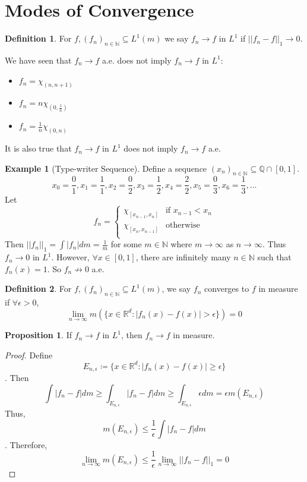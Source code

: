 \documentclass{article}
\theoremstyle{definition}
\newtheorem{definition}{Definition}[section]
\newtheorem{prop}{Proposition}[section]
\newtheorem{example}{Example}[section]
\theoremstyle{remark}
\theoremstyle{remark}
\def\reals{{\mathbb R}}
\def\naturals{{\mathbb N}}
\def\rationals{{\mathbb Q}}
\begin{document}
\section{Modes of Convergence}
\begin{definition}
For $f, (f_n)_{n\in\naturals} \subseteq L^1(m)$ we say $f_n \to f$ in $L^1$ if $||f_n - f||_1 \to 0$.
\end{definition}
We have seen that $f_n \to f$ a.e. does not imply $f_n \to f$ in $L^1$:
\begin{itemize}
	\item $f_n = \chi_{(n, n+1)}$
	\item $f_n = n\chi_{(0, \frac{1}{n})}$
	\item $f_n = \frac{1}{n}\chi_{(0, n)}$
\end{itemize}
It is also true that $f_n \to f$ in $L^1$ does not imply $f_n \to f$ a.e.
\begin{example}[Type-writer Sequence]
Define a sequence $(x_n)_{n\in\naturals} \subseteq \rationals \cap [0, 1]$.
$$x_0 = \frac{0}{1}, x_1 = \frac{1}{1}, x_2 = \frac{0}{2}, x_3 = \frac{1}{2}, x_4 = \frac{2}{2}, x_5 = \frac{0}{3}, x_6 = \frac{1}{3}, \dots $$
Let
$$ f_n = \begin{cases}
\chi_{[x_{n-1}, x_n]} & \text{if } x_{n-1} < x_n \\
\chi_{[x_n, x_{n-1}]} & \text{otherwise} \\
\end{cases}$$
Then $||f_n||_1 = \int |f_n| dm = \frac{1}{m}$ for some $m\in \naturals$ where $m\to \infty$ as $n\to \infty$. Thus $f_n\to 0$ in $L^1$. However, $\forall x \in [0, 1]$, there are infinitely many $n\in\naturals$ such that $f_n(x) = 1$. So $f_n\not\to 0$ a.e.
\end{example}
\begin{definition}
For $f, (f_n)_{n\in\naturals}\subseteq L^1(m)$, we say $f_n$ converges to $f$ in measure if $\forall \epsilon > 0$,
$$\lim_{n\to\infty} m(\{x\in \reals^d : |f_n(x) - f(x)| > \epsilon\}) = 0$$
\end{definition}
\begin{prop}
If $f_n\to f$ in $L^1$, then $f_n \to f$ in measure.
\end{prop}
\begin{proof}
Define 
$$E_{n, \epsilon} \coloneqq \{x\in\reals^d : |f_n(x) - f(x)| \geq \epsilon\}$$. 
Then
$$\int |f_n - f| dm \geq \int_{E_{n, \epsilon}} |f_n - f| dm \geq \int_{E_{n,\epsilon}} \epsilon dm = \epsilon m(E_{n,\epsilon})$$
Thus,
$$m(E_{n,\epsilon}) \leq \frac{1}{\epsilon} \int |f_n - f| dm$$.
Therefore,
$$\lim_{n\to\infty} m(E_{n,\epsilon}) \leq \frac{1}{\epsilon} \lim_{n\to\infty} ||f_n - f||_1 = 0$$
\end{proof}
\end{document}
